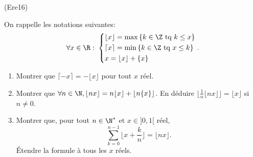 \begin{tiny}(Ere16)\end{tiny} On rappelle les notations suivantes:
\begin{displaymath}
\forall x\in \R:\;
\left\lbrace 
\begin{aligned}
 &\lfloor x \rfloor = \max \left\lbrace k\in \Z \text{ tq } k\leq x\right\rbrace \\
 &\lceil x \rceil = \min \left\lbrace k\in \Z \text{ tq } x\leq k\right\rbrace \\
 & x = \lfloor x \rfloor + \{x\}
\end{aligned}
\right. .
\end{displaymath}
\begin{enumerate}
 \item Montrer que $\lceil -x \rceil = - \lfloor x \rfloor$ pour tout $x$ réel.
 
\item Montrer que $\forall n\in \N, \lfloor nx \rfloor = n \lfloor x \rfloor + \lfloor n\{x\}\rfloor$.\newline
En déduire $\lfloor\frac{1}{n}\lfloor nx\rfloor\rfloor  = \lfloor x\rfloor$ si $n\neq 0$.

 \item Montrer que, pour tout $n\in \N^*$ et $x\in ]0,1[$ réel,
\begin{displaymath}
 \sum_{k=0}^{n-1}\lfloor x+\frac{k}{n}\rfloor = \lfloor nx\rfloor .
\end{displaymath}
 \'Etendre la formule à tous les $x$ réels.
\end{enumerate}
